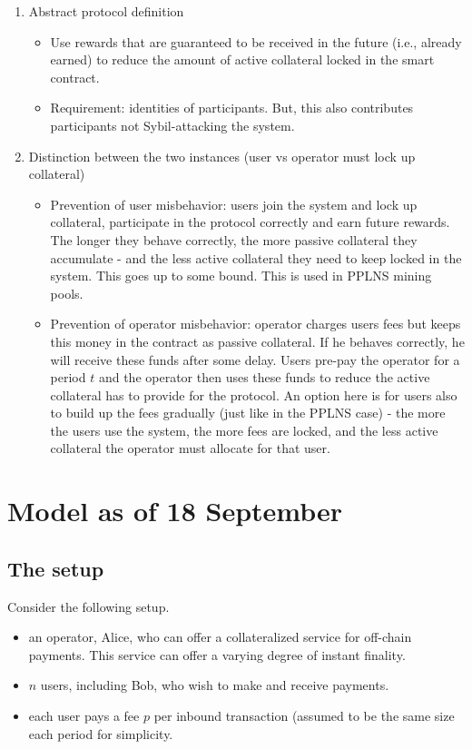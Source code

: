 \documentclass[runningheads]{llncs}
\begin{document}
\begin{enumerate}
    \item Abstract protocol definition
    \begin{itemize}
        \item Use rewards that are guaranteed to be received in the future (i.e., already earned) to reduce the amount of active collateral locked in the smart contract.
    \item Requirement: identities of participants. But, this also contributes participants not Sybil-attacking the system.
    \end{itemize}
    \item Distinction between the two instances (user vs operator must lock up collateral)
    \begin{itemize}
        \item Prevention of user misbehavior: users join the system and lock up collateral, participate in the protocol correctly and earn future rewards. The longer they behave correctly, the more passive collateral they accumulate - and the less active collateral they need to keep locked in the system. This goes up to some bound. This is used in PPLNS mining pools.
        \item Prevention of operator misbehavior: operator charges users fees but keeps this money in the contract as passive collateral. If he behaves correctly, he will receive these funds after some delay. Users pre-pay the operator for a period $t$ and the operator then uses these funds to reduce the active collateral has to provide for the protocol.
        An option here is for users also to build up the fees gradually (just like in the PPLNS case) - the more the users use the system, the more fees are locked, and the less active collateral the operator must allocate for that user.
    \end{itemize}
\end{enumerate}

\section{Model as of 18 September}

\subsection{The setup}

Consider the following setup.

\begin{itemize}
    \item an operator, Alice, who can offer a collateralized service for off-chain payments. This service can offer a varying degree of instant finality. 
    \item $n$ users, including Bob, who wish to make and receive payments. 
    \item each user pays a fee $p$ per inbound transaction (assumed to be the same size each period for simplicity.
\end{itemize}
\end{document}
